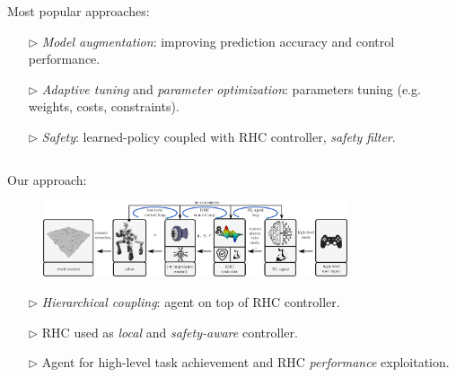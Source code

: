 \vskip0.5cm
\begin{columns}[t]
	\begin{Large}
	\begin{column}{0.025\textwidth}
	\end{column}
	\begin{column}{0.375\textwidth}
		Most popular approaches:
		\begin{itemize}
			\item[$\rhd$] \textit{Model augmentation}: improving prediction accuracy and control performance.
			\item[$\rhd$] \textit{Adaptive tuning} and \textit{parameter optimization}: parameters tuning (e.g. weights, costs, constraints).
			\item[$\rhd$] \textit{Safety}: learned-policy coupled with RHC controller, \textit{safety filter}.
		\end{itemize}

	\end{column}

	\begin{column}{0.6\textwidth}
		Our approach:
		\begin{figure}[h]
			\includegraphics[width=0.8\textwidth]{docs/imgs/approach.png}
		\end{figure}
		\begin{itemize}
			\item[$\rhd$] \textit{Hierarchical coupling}: agent on top of RHC controller.
			\item[$\rhd$] RHC used as \textit{local} and \textit{safety-aware} controller.
			\item[$\rhd$] Agent for high-level task achievement and RHC \textit{performance} exploitation.
		\end{itemize}
		
	\end{column}
	\end{Large}
\end{columns}
